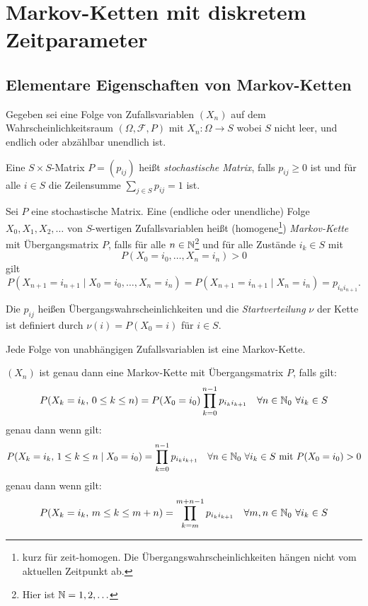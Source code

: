 \documentclass[a4paper,twoside,DIV15,BCOR12mm]{scrbook}
\newcommand{\cF}{\mathcal F}
\begin{document}
\setcounter{chapter}{0}
\renewcommand{\thesection}{\arabic{section}}
\renewcommand{\thechapter}{\Roman{chapter}}

\chapter{Markov-Ketten mit diskretem Zeitparameter}

\section{Elementare Eigenschaften von Markov-Ketten}

Gegeben sei eine Folge von Zufallsvariablen $(X_n)$ auf dem Wahrscheinlichkeitsraum $(\Omega, \cF, P)$ mit $X_n:\Omega \to S$ wobei $S$ nicht leer, und endlich oder abzählbar unendlich ist.

\begin{definition}
Eine $S\times S$-Matrix $P=(p_{ij})$ heißt \emph{stochastische Matrix}, falls $p_{ij}\ge0$ ist und für alle $i\in S$ die Zeilensumme $\sum_{j\in S} p_{ij} = 1$ ist.
\end{definition}

\begin{definition}
Sei $P$ eine stochastische Matrix. Eine (endliche oder unendliche) Folge $X_0, X_1, X_2,\ldots$ von $S$-wertigen Zufallsvariablen heißt (homogene\footnote{kurz für zeit-homogen. Die Übergangswahrscheinlichkeiten hängen nicht vom aktuellen Zeitpunkt ab.}) \emph{Markov-Kette} mit Übergangsmatrix $P$, falls für alle $n\in \mathbb{N}$\footnote{Hier ist $\mathbb{N}=1,2,\ldots$} und für alle Zustände $i_k\in S$ mit 
\[
P(X_0=i_0,\ldots,X_n=i_n) >0
\]
gilt
\[
P(X_{n+1} = i_{n+1} \mid X_0 = i_0, \ldots, X_n=i_n) = 
P(X_{n+1} = i_{n+1} \mid X_n=i_n) = p_{i_n i_{n+1}}.
\]

Die $p_{ij}$ heißen Übergangswahrscheinlichkeiten und die \emph{Startverteilung} $\nu$ der Kette ist definiert durch $\nu(i)=P(X_0=i)$ für $i\in S$.
\end{definition}

\begin{bemerkung}
Jede Folge von unabhängigen Zufallsvariablen ist eine Markov-Kette.
\end{bemerkung}

\begin{satz}
$(X_n)$ ist genau dann eine Markov-Kette mit Übergangsmatrix $P$, falls gilt:
\[
P(X_k = i_k,\, 0\le k\le n) = P(X_0 = i_0)\prod_{k=0}^{n-1} p_{i_k i_{k+1}} \quad \forall n\in \mathbb{N}_0 \ \forall i_k\in S
\]
genau dann wenn gilt:
\[
P(X_k = i_k,\, 1\le k\le n \mid X_0=i_0) = \prod_{k=0}^{n-1} p_{i_k i_{k+1}} \quad \forall n\in \mathbb{N}_0 \ \forall i_k\in S\text{ mit $P(X_0=i_0)>0$}
\]
genau dann wenn gilt:
\[
P(X_k = i_k,\,m\le k\le m+n) = \prod_{k=m}^{m+n-1} p_{i_k i_{k+1}} \quad \forall m,n\in \MdN_0 \ \forall i_k\in S
\]
\end{satz}
\end{document}
